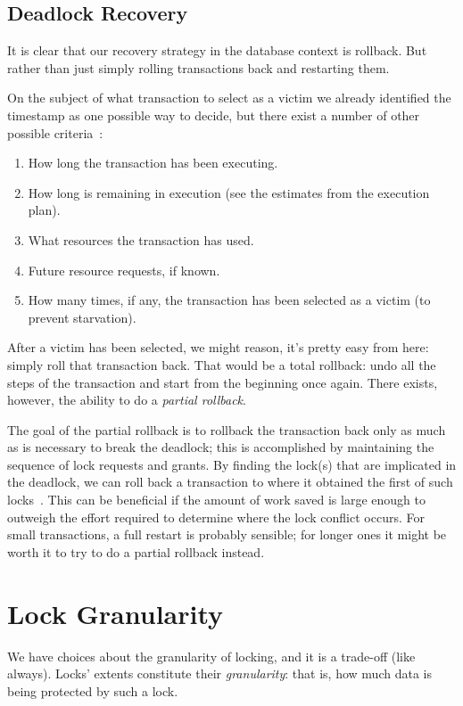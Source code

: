 \documentclass[a4paper]{report}
\begin{document}
\subsection*{Deadlock Recovery}

It is clear that our recovery strategy in the database context is rollback. But rather than just simply rolling transactions back and restarting them. 

On the subject of what transaction to select as a victim we already identified the timestamp as one possible way to decide, but there exist a number of other possible criteria~\cite{dsc}:

\begin{enumerate}
\item How long the transaction has been executing.
	\item How long is remaining in execution (see the estimates from the execution plan).
	\item What resources the transaction has used.
	\item Future resource requests, if known.
	\item How many times, if any, the transaction has been selected as a victim (to prevent starvation).
\end{enumerate}

After a victim has been selected, we might reason, it's pretty easy from here: simply roll that transaction back. That would be a total rollback: undo all the steps of the transaction and start from the beginning once again. There exists, however, the ability to do a \textit{partial rollback}. 

The goal of the partial rollback is to rollback the transaction back only as much as is necessary to break the deadlock;  this is accomplished by maintaining the sequence of lock requests and grants. By finding the lock(s) that are implicated in the deadlock, we can roll back a transaction to where it obtained the first of such locks~\cite{dsc}. This can be beneficial if the amount of work saved is large enough to outweigh the effort required to determine where the lock conflict occurs. For small transactions, a full restart is probably sensible; for longer ones it might be worth it to try to do a partial rollback instead.

\section*{Lock Granularity}

We have choices about the granularity of locking, and it is a trade-off (like always). Locks' extents constitute their {\it granularity}: that is, how much data is being protected by such a lock.
\end{document}
